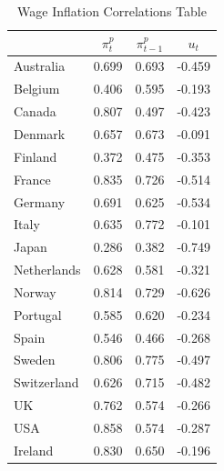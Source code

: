 \begin{table}[htbp]
\caption{\label{T_Correlation} Wage Inflation Correlations Table}\centering\medskip
\begin{tabular}{lccc} \hline \hline
 & $\pi_t^p$  & $\pi_{t-1}^p$  & $\hspace{0em}u_t$ \\  \hline 
Australia &     0.699 &     0.693 &    -0.459 \\  
Belgium &     0.406 &     0.595 &    -0.193 \\  
Canada &     0.807 &     0.497 &    -0.423 \\  
Denmark &     0.657 &     0.673 &    -0.091 \\  
Finland &     0.372 &     0.475 &    -0.353 \\  
France &     0.835 &     0.726 &    -0.514 \\  
Germany &     0.691 &     0.625 &    -0.534 \\  
Italy &     0.635 &     0.772 &    -0.101 \\  
Japan &     0.286 &     0.382 &    -0.749 \\  
Netherlands &     0.628 &     0.581 &    -0.321 \\  
Norway &     0.814 &     0.729 &    -0.626 \\  
Portugal &     0.585 &     0.620 &    -0.234 \\  
Spain &     0.546 &     0.466 &    -0.268 \\  
Sweden &     0.806 &     0.775 &    -0.497 \\  
Switzerland &     0.626 &     0.715 &    -0.482 \\  
UK &     0.762 &     0.574 &    -0.266 \\  
USA &     0.858 &     0.574 &    -0.287 \\  
Ireland &     0.830 &     0.650 &    -0.196 \\  
\hline \hline \end{tabular}
\end{table}
